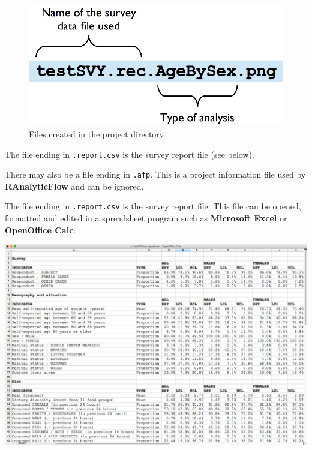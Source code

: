 \documentclass[12pt,a4paper]{book}
\theoremstyle{definition}
\theoremstyle{definition}
\theoremstyle{definition}
\theoremstyle{remark}
\begin{document}
\begin{figure}[H]

{\centering \includegraphics[width=800pt]{figures/workflowResults02} 

}

\caption{Files created in the project directory}\label{fig:raf6}
\end{figure}

The file ending in \texttt{.report.csv} is the survey report file (see
below).

There may also be a file ending in \texttt{.afp}. This is a project
information file used by \textbf{RAnalyticFlow} and can be ignored.

The file ending in \texttt{.report.csv} is the survey report file. This
file can be opened, formatted and edited in a spreadsheet program such
as \textbf{Microsoft Excel} or \textbf{OpenOffice Calc}:

\begin{center}\includegraphics[width=800pt]{figures/reportFile} \end{center}
\end{document}
